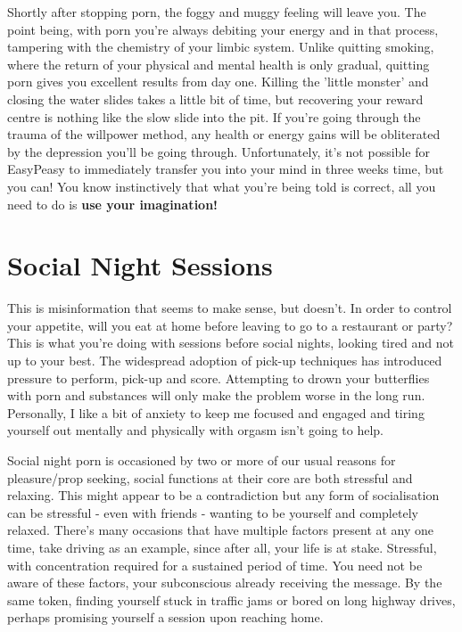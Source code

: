 \documentclass[
]{book}
\begin{document}
Shortly after stopping porn, the foggy and muggy feeling will leave you. The point being, with porn you're always debiting your energy and in that process, tampering with the chemistry of your limbic system. Unlike quitting smoking, where the return of your physical and mental health is only gradual, quitting porn gives you excellent results from day one. Killing the 'little monster' and closing the water slides takes a little bit of time, but recovering your reward centre is nothing like the slow slide into the pit. If you're going through the trauma of the willpower method, any health or energy gains will be obliterated by the depression you'll be going through. Unfortunately, it's not possible for EasyPeasy to immediately transfer you into your mind in three weeks time, but you can! You know instinctively that what you're being told is correct, all you need to do is \textbf{use your imagination!}

\hypertarget{social-night-sessions}{%
\section{Social Night Sessions}\label{social-night-sessions}}

This is misinformation that seems to make sense, but doesn't. In order to control your appetite, will you eat at home before leaving to go to a restaurant or party? This is what you're doing with sessions before social nights, looking tired and not up to your best. The widespread adoption of pick-up techniques has introduced pressure to perform, pick-up and score. Attempting to drown your butterflies with porn and substances will only make the problem worse in the long run. Personally, I like a bit of anxiety to keep me focused and engaged and tiring yourself out mentally and physically with orgasm isn't going to help.

Social night porn is occasioned by two or more of our usual reasons for pleasure/prop seeking, social functions at their core are both stressful and relaxing. This might appear to be a contradiction but any form of socialisation can be stressful - even with friends - wanting to be yourself and completely relaxed. There's many occasions that have multiple factors present at any one time, take driving as an example, since after all, your life is at stake. Stressful, with concentration required for a sustained period of time. You need not be aware of these factors, your subconscious already receiving the message. By the same token, finding yourself stuck in traffic jams or bored on long highway drives, perhaps promising yourself a session upon reaching home.
\end{document}

